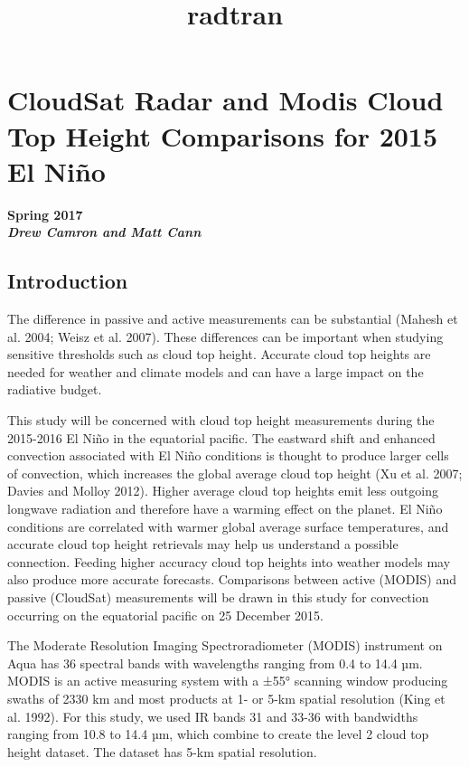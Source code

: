 \documentclass[11pt]{article}
\title{radtran}
\begin{document}
    
    
    \maketitle
    
    

    
    \section{CloudSat Radar and Modis Cloud Top Height Comparisons for 2015
El
Niño}\label{cloudsat-radar-and-modis-cloud-top-height-comparisons-for-2015-el-niuxf1o}

\textbf{Spring 2017\\
\emph{Drew Camron and Matt Cann}}

    \subsection{Introduction}\label{introduction}

The difference in passive and active measurements can be substantial
(Mahesh et al. 2004; Weisz et al. 2007). These differences can be
important when studying sensitive thresholds such as cloud top height.
Accurate cloud top heights are needed for weather and climate models and
can have a large impact on the radiative budget.

This study will be concerned with cloud top height measurements during
the 2015-2016 El Niño in the equatorial pacific. The eastward shift and
enhanced convection associated with El Niño conditions is thought to
produce larger cells of convection, which increases the global average
cloud top height (Xu et al. 2007; Davies and Molloy 2012). Higher
average cloud top heights emit less outgoing longwave radiation and
therefore have a warming effect on the planet. El Niño conditions are
correlated with warmer global average surface temperatures, and accurate
cloud top height retrievals may help us understand a possible
connection. Feeding higher accuracy cloud top heights into weather
models may also produce more accurate forecasts. Comparisons between
active (MODIS) and passive (CloudSat) measurements will be drawn in this
study for convection occurring on the equatorial pacific on 25 December
2015.

The Moderate Resolution Imaging Spectroradiometer (MODIS) instrument on
Aqua has 36 spectral bands with wavelengths ranging from 0.4 to 14.4 µm.
MODIS is an active measuring system with a ±55° scanning window
producing swaths of 2330 km and most products at 1- or 5-km spatial
resolution (King et al. 1992). For this study, we used IR bands 31 and
33-36 with bandwidths ranging from 10.8 to 14.4 µm, which combine to
create the level 2 cloud top height dataset. The dataset has 5-km
spatial resolution.
\end{document}
